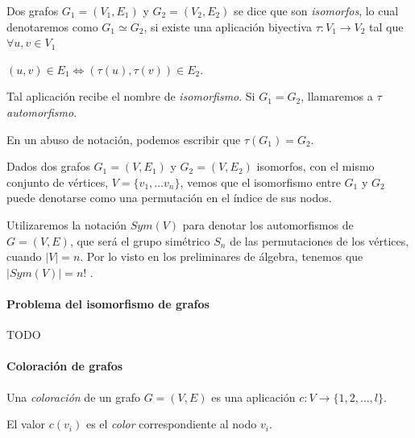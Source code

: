 \begin{definition}
	Dos grafos $G_1 = (V_1, E_1)$ y $G_2 = (V_2, E_2)$ se dice que son \textit{isomorfos}, lo cual denotaremos como $G_1 \simeq G_2$, si existe una aplicación biyectiva $\tau : V_1 \rightarrow V_2$ tal que $\forall u,v \in V_1$
	
	\begin{center}
		$(u,v) \in E_1 \Leftrightarrow (\tau(u), \tau(v)) \in E_2 $.
	\end{center}
	
	Tal aplicación recibe el nombre de \textit{isomorfismo}. Si $G_1 = G_2$, llamaremos a $\tau$ \textit{automorfismo}.
\end{definition}

En un abuso de notación, podemos escribir que $\tau(G_1) = G_2$.


\hfil

Dados dos grafos $G_1 = (V, E_1)$ y $G_2 = (V, E_2)$ isomorfos, con el mismo conjunto de vértices, $V=\{v_1,\dots v_n\}$, vemos que el isomorfismo entre $G_1$ y $G_2$ puede denotarse como una permutación en el índice de sus nodos.

Utilizaremos la notación $Sym(V)$ para denotar los automorfismos de $G=(V,E)$, que será el grupo simétrico $S_n$ de las permutaciones de los vértices, cuando $\mid V \mid=n$. Por lo visto en los preliminares de álgebra, tenemos que $\mid Sym(V) \mid = n!$ .

\hfil

\paragraph{Problema del isomorfismo de grafos}

\hfil

TODO



\hfil


\paragraph{Coloración de grafos}

\hfil

\begin{definition}
	Una \textit{coloración} de un grafo $G=(V,E)$ es una aplicación $c:V\rightarrow \{1,2,\dots , l\}$.

	El valor $c(v_i)$ es el \textit{color} correspondiente al nodo $v_i$.
\end{definition}

